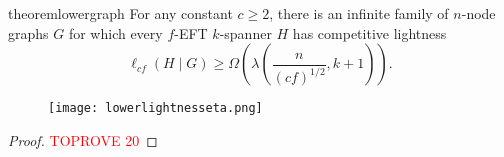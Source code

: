 \documentclass{article}
\theoremstyle{plain}
\theoremstyle{definition}
\begin{document}
\begin{restatable}{theorem}{lowergraph} \label{thm:lower-bound-lambda-graph}
     For any constant $c \geq 2$, there is an infinite family of $n$-node graphs $G$ for which every $f$-EFT $k$-spanner $H$ has competitive lightness
     $$\ell_{cf}(H \mid G) \geq \Omega\left(\lambda\left(\frac{n}{(cf)^{1/2}}, k+1\right)\right).$$
\end{restatable}
\begin{figure}[b]
    \centering
    \texttt{[image: lowerlightnesseta.png]}
    \label{fig:edgechange}
\end{figure}

\begin{proof}\textcolor{red}{TOPROVE 20}\end{proof}



\fi
\end{document}
